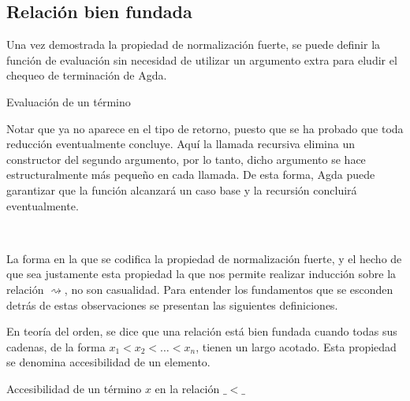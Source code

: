 


\subsection{Relación bien fundada}

Una vez demostrada la propiedad de normalización fuerte, se puede definir la función de evaluación sin necesidad de utilizar un argumento extra para eludir el chequeo de terminación de Agda.
  
\begin{codigo}
	Evaluación de un término
\end{codigo}

Notar que ya no aparece  en el tipo de retorno, puesto que se ha probado que toda reducción eventualmente concluye.
Aquí la llamada recursiva elimina un constructor  del segundo argumento, por lo tanto, dicho argumento se hace estructuralmente más pequeño en cada llamada.
De esta forma, Agda puede garantizar que la función alcanzará un caso base y la recursión concluirá eventualmente.

\begin{example}
	~\newline
\end{example}

La forma en la que se codifica la propiedad de normalización fuerte, y el hecho de que sea justamente esta propiedad la que nos permite realizar inducción sobre la relación $\rightsquigarrow$, no son casualidad.
Para entender los fundamentos que se esconden detrás de estas observaciones se presentan las siguientes definiciones.

En teoría del orden, se dice que una relación está bien fundada cuando todas sus cadenas, de la forma $x_1 < x_2 < \dots < x_n$, tienen un largo acotado.
Esta propiedad se denomina accesibilidad de un elemento.

\begin{codigo}
	Accesibilidad de un término $x$ en la relación $\_<\_$
\end{codigo}

